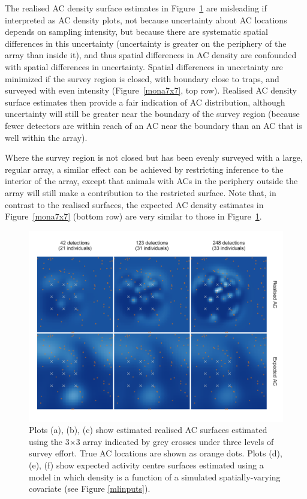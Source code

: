 \documentclass[useAMS,usenatbib,referee]{biom}
\begin{document}
The realised AC density surface estimates in Figure~\ref{mona3x3} are misleading if interpreted as AC density plots, not because uncertainty about AC locations depends on sampling intensity, but because there are systematic spatial differences in this uncertainty (uncertainty is greater on the periphery of the array than inside it), and thus spatial differences in AC density are confounded with spatial differences in uncertainty. Spatial differences in uncertainty are minimized if the survey region is closed, with boundary close to traps, and surveyed with even intensity (Figure~\ref{mona7x7}, top row). Realised AC density surface estimates then provide a fair indication of AC distribution, although uncertainty will still be greater near the boundary of the survey region (because fewer detectors are within reach of an AC near the boundary than an AC that is well within the array). 

Where the survey region is not closed but has been evenly surveyed with a large, regular array, a similar effect can be achieved by restricting inference to the interior of the array, except that animals with ACs in the periphery outside the array will still make a contribution to the restricted surface. Note that, in contrast to the realised surfaces, the expected AC density estimates in Figure~\ref{mona7x7} (bottom row) are very similar to those in Figure~\ref{mona3x3}. 

\begin{figure}[htbp]
\centering
\includegraphics[width=1\textwidth]{mona_3x3.png}
\caption{Plots (a), (b), (c) show estimated realised AC surfaces estimated using the 3$\times$3 array indicated by grey crosses under three levels of survey effort. True AC locations are shown as orange dots. Plots (d), (e), (f) show expected activity centre surfaces estimated using a model in which density is a function of a simulated spatially-varying covariate (see Figure \ref{mlinputs}).}
\label{mona3x3}
\end{figure}
\end{document}
